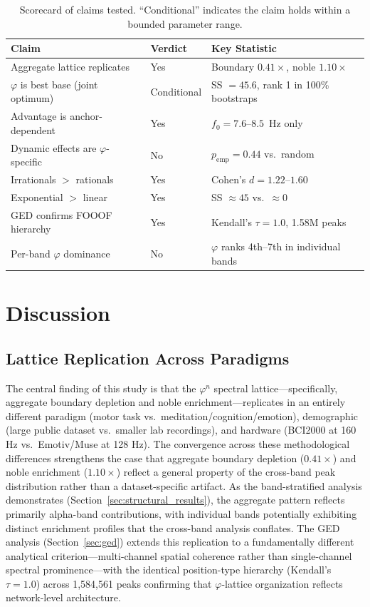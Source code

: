 \documentclass[11pt,a4paper]{article}
\newcommand{\phisym}{\varphi}
\newcommand{\fzero}{f_0}
\begin{document}
\begin{table}[H]
\centering
\caption{Scorecard of claims tested. ``Conditional'' indicates the claim holds within a bounded parameter range.}
\label{tab:scorecard}
\small
\begin{tabular}{@{}p{4.2cm}lp{5.5cm}@{}}
\toprule
Claim & Verdict & Key Statistic \\
\midrule
Aggregate lattice replicates & Yes & Boundary $0.41\times$, noble $1.10\times$ \\
$\phisym$ is best base (joint optimum) & Conditional & SS $= 45.6$, rank 1 in 100\% bootstraps \\
Advantage is anchor-dependent & Yes & $\fzero = 7.6$--$8.5$~Hz only \\
Dynamic effects are $\phisym$-specific & No & $p_{\text{emp}} = 0.44$ vs.\ random \\
Irrationals $>$ rationals & Yes & Cohen's $d = 1.22$--$1.60$ \\
Exponential $>$ linear & Yes & SS $\approx 45$ vs.\ $\approx 0$ \\
GED confirms FOOOF hierarchy & Yes & Kendall's $\tau = 1.0$, 1.58M peaks \\
Per-band $\phisym$ dominance & No & $\phisym$ ranks 4th--7th in individual bands \\
\bottomrule
\end{tabular}
\end{table}

\section{Discussion}
\label{sec:discussion}

\subsection{Lattice Replication Across Paradigms}

The central finding of this study is that the $\phisym^n$ spectral lattice---specifically, aggregate boundary depletion and noble enrichment---replicates in an entirely different paradigm (motor task vs.\ meditation/cognition/emotion), demographic (large public dataset vs.\ smaller lab recordings), and hardware (BCI2000 at 160 Hz vs.\ Emotiv/Muse at 128 Hz). The convergence across these methodological differences strengthens the case that aggregate boundary depletion ($0.41\times$) and noble enrichment ($1.10\times$) reflect a general property of the cross-band peak distribution rather than a dataset-specific artifact. As the band-stratified analysis demonstrates (Section~\ref{sec:structural_results}), the aggregate pattern reflects primarily alpha-band contributions, with individual bands potentially exhibiting distinct enrichment profiles that the cross-band analysis conflates. The GED analysis (Section~\ref{sec:ged}) extends this replication to a fundamentally different analytical criterion---multi-channel spatial coherence rather than single-channel spectral prominence---with the identical position-type hierarchy (Kendall's $\tau = 1.0$) across 1,584,561 peaks confirming that $\phisym$-lattice organization reflects network-level architecture.
\end{document}
